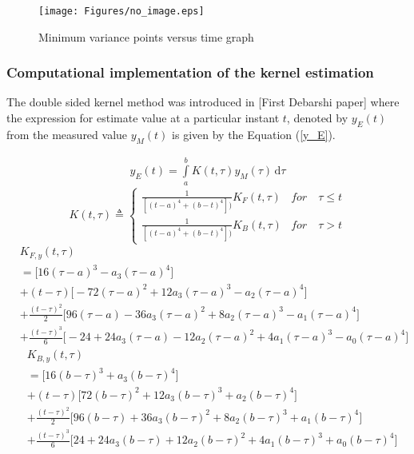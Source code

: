 \documentclass{article}
\begin{document}
\begin{figure}[H]
\centering
\texttt{[image: Figures/no\_image.eps]}
\caption{Minimum variance points versus time graph}
\label{quad_red_balls}
\end{figure}

\subsubsection{Computational implementation of the kernel estimation}
The double sided kernel method was introduced in [First Debarshi paper] where the expression for estimate value at a particular instant $t$, denoted by $y_E(t)$ from the measured value $y_M(t)$ is given by the Equation (\ref{y_E}). 

\begin{equation}
\begin{split}
y_E(t) = \int\limits_{a}^{b}K(t,\tau) y_M(\tau)\, \mathrm{d}\tau
\end{split}
\label{y_E}
\end{equation}
\begin{equation}
K(t,\tau) \triangleq \left\{
\begin{array}{lr}
\frac{1}{[(t-a)^4+(b-t)^4])} K_{F}(t,\tau) & for \quad \tau \le t\\
\frac{1}{[(t-a)^4+(b-t)^4])} K_{B}(t,\tau) & for \quad \tau > t
\end{array}
\right.
\label{K}
\end{equation}
\begin{equation}\label{Kf}
\begin{split}
	& K_{F,y}(t,\tau)\\
	&=\bigg[16(\tau-a)^{3}-a_3(\tau-a)^{4}\bigg]\\
	&+(t-\tau)\bigg[-72(\tau-a)^2 + 12a_3(\tau-a)^3 - a_2(\tau-a)^4\bigg]\\
	&+\frac{(t-\tau)^2}{2}\bigg[96(\tau-a) - 36a_3(\tau-a)^2 + 8a_2(\tau-a)^3 -a_1(\tau-a)^4\bigg]\\
	&+\frac{(t-\tau)^3}{6}\bigg[-24 + 24a_3(\tau-a) - 12a_2(\tau-a)^2 + 4a_1(\tau-a)^3 - a_0(\tau-a)^4\bigg]	
\end{split}
\end{equation}
\begin{equation}\label{eqn.73}
\begin{split}
	&K_{B,y}(t,\tau)\\
	&=\bigg[16(b-\tau)^{3} + a_3(b-\tau)^{4}\bigg]\\
	&+(t-\tau)\bigg[72(b-\tau)^{2} + 12a_3(b-\tau)^{3} + a_2(b-\tau)^{4}\bigg]\\
	&+\frac{(t-\tau)^{2}}{2}\bigg[96(b-\tau)+36a_3(b-\tau)^{2} + 8a_2(b-\tau)^{3} + a_1(b-\tau)^{4}\bigg]\\
	&+\frac{(t-\tau)^{3}}{6}\bigg[24+24a_3(b-\tau)+12a_2(b-\tau)^{2}+4a_1(b-\tau)^{3}+a_0(b-\tau)^{4}\bigg]
\end{split}
\end{equation}
\end{document}
